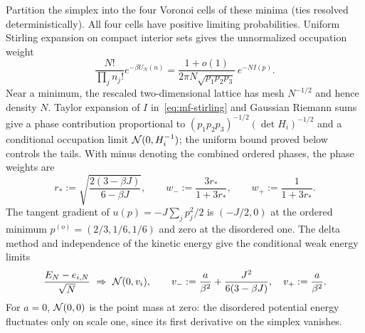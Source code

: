 Partition the simplex into the four Voronoi cells of these minima
(ties resolved deterministically). All four cells have positive limiting
probabilities. Uniform Stirling expansion on compact interior sets gives
the unnormalized occupation weight
\begin{equation}
 \frac{N!}{\prod_j n_j!}e^{-\beta U_N(n)}
 =\frac{1+o(1)}{2\pi N\sqrt{p_1p_2p_3}}\,e^{-NI(p)}.
 \label{eq:mf-stirling}
\end{equation}
Near a minimum, the rescaled two-dimensional lattice has mesh
$N^{-1/2}$ and hence density $N$. Taylor expansion of $I$
in~\eqref{eq:mf-stirling} and Gaussian Riemann sums give a phase
contribution proportional to
$(p_1p_2p_3)^{-1/2}(\det H_i)^{-1/2}$ and a conditional occupation
limit $\mathcal N(0,H_i^{-1})$; the uniform bound proved below controls
the tails. With minus denoting the combined ordered phases, the phase
weights are
\begin{equation}
 r_*:=\sqrt{\frac{2(3-\beta J)}{6-\beta J}},\qquad
 w_-:=\frac{3r_*}{1+3r_*},\qquad w_+:=\frac1{1+3r_*}.
 \label{eq:mf-phase-weights}
\end{equation}
The tangent gradient of $u(p)=-J\sum_jp_j^2/2$ is
$(-J/2,0)$ at the ordered minimum $p^{(o)}=(2/3,1/6,1/6)$ and zero at
the disordered one. The delta method and independence of the kinetic
energy give the conditional weak energy limits
\begin{equation}
 \frac{E_N-e_{i,N}}{\sqrt N}\ \Rightarrow\ \Normal(0,v_i),
 \qquad
 v_-:=\frac a{\beta^2}+\frac{J^2}{6(3-\beta J)},\quad
 v_+:=\frac a{\beta^2}.
 \label{eq:mf-variances}
\end{equation}
For $a=0$, $\mathcal N(0,0)$ is the point mass at zero: the disordered
potential energy fluctuates only on scale one, since its first
derivative on the simplex vanishes.

